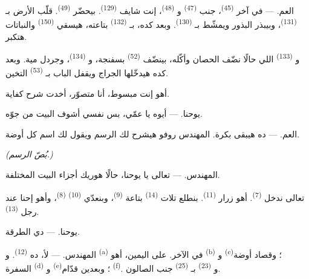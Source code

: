 \VUsaut{3.0mm}

\textsc{العم}. --- في آخر  \textsuperscript{(45)}، جنب  \textsuperscript{(47)} و \textsuperscript{(48)}، إنت شايف
 \textsuperscript{(129)}. بيحضّر 
\textsuperscript{(49)}. قلّب الأرض بـ \textsuperscript{(131)}، وبيبذر البذور
ويمشّط بـ \textsuperscript{(130)}. وبعد كده، بـ
\textsuperscript{(132)} بتاعته، هيسقي  \textsuperscript{(150)} والنباتات
هتكبر.

و \textsuperscript{(133)} اللي حالًا نضّف الحصان وأكّله، بينضّف
 \textsuperscript{(52)} بسفنجة، و \textsuperscript{(134)}،
وجردل مية. وبعد كده هيدخّلها الجراج ويقفل الباب بـ
\textsuperscript{(53)} التخين.

أهو إنت مبسوط، أنا متصوّر، أخدت شرح كفاية.

\textsc{يوحنا}. --- أيوه يا عمّي، بس نفسي أشوف البيت من جوّه.

\textsc{العم}. --- ده هيبقى بكرة. المهندس روفو هيشرح لك الرسم ويقول لك اسم كل
أوضة.

\VUsaut{3.0mm}
\VUsaut{2.4mm}

{\centering\textit{(بُصّ الرسم.)}\par}
\VUsaut{2.4mm}

\textsc{المهندس}. --- تعالى يا يوحنا، حالًا هوريك أجزاء البيت المختلفة.

تعالى ندخل  \textsuperscript{(7)}. أهو زرار 
\textsuperscript{(11)}. بنطلع تلات  \textsuperscript{(14)} بتاعة  \textsuperscript{(9)}، وبنعدّي  \textsuperscript{(10)} 
\textsuperscript{(8)}، وأهو إحنا عند رجل  \textsuperscript{(13)}.

\textsc{يوحنا}. --- دي الطرقة.

\textsc{المهندس}. --- لأ، ده  \textsuperscript{(12)}.
و \textsuperscript{(a)} في الآخر. على اليمين، أهو 
\textsuperscript{(b)} و \textsuperscript{(c)}؛ وقصاد أوضة السفرة
 \textsuperscript{(d)} و \textsuperscript{(e)}؛ وبعدين قدّام
 \textsuperscript{(f)}. و \textsuperscript{(23)}
بـ \textsuperscript{(25)} جنب الصالون.

